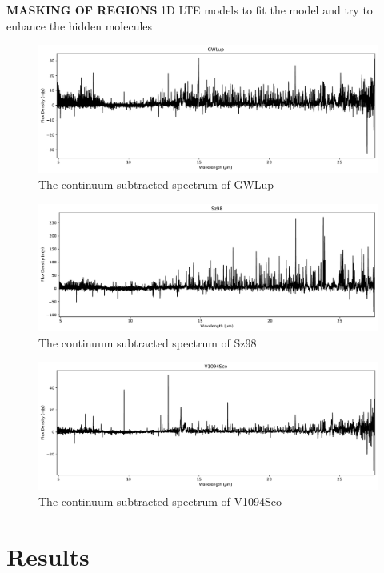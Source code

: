 \documentclass[twoside, single, authoryear, semicolon]{lion-msc}
\newcommand{\3}{$_3$}
\newcommand{\2}{$_2$}
\begin{document}
\textbf{MASKING OF REGIONS}
1D LTE models to fit the model and try to enhance the hidden molecules
\begin{figure}[!ht]
    \centering
    \includegraphics[width=\linewidth]{Figures/FullSpectrum_GWLup.pdf}
    \caption{The continuum subtracted spectrum of GWLup}
    \label{fig:GWLup}
\end{figure}
\begin{figure}[!ht]
    \centering
    \includegraphics[width=\linewidth]{Figures/FullSpectrum_Sz98.pdf}
    \caption{The continuum subtracted spectrum of Sz98}
    \label{fig:Sz98}
\end{figure}
\begin{figure}[!ht]
    \centering
    \includegraphics[width=\linewidth]{Figures/FullSpectrum_V1094Sco.pdf}
    \caption{The continuum subtracted spectrum of V1094Sco}
    \label{fig:V1094Sco}
\end{figure}



\chapter{Results}
\end{document}
